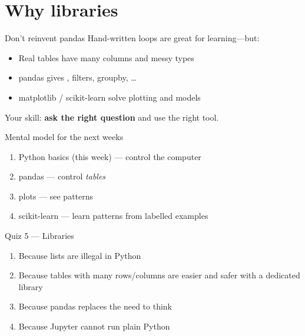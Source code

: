 \documentclass[aspectratio=169,11pt]{beamer}
\begin{document}
    \section{Why libraries}

    \begin{frame}{Don't reinvent pandas}
        Hand-written loops are great for learning---but:
        \begin{itemize}
            \item Real tables have many columns and messy types
            \item pandas gives , filters, groupby, \ldots
            \item matplotlib / scikit-learn solve plotting and models
        \end{itemize}
        \vspace{0.5em}
        Your skill: \textbf{ask the right question} and use the right tool.
    \end{frame}

    \begin{frame}{Mental model for the next weeks}
        \begin{enumerate}
            \item Python basics (this week) --- control the computer
            \item pandas --- control \emph{tables}
            \item plots --- see patterns
            \item scikit-learn --- learn patterns from labelled examples
        \end{enumerate}
    \end{frame}

    \begin{frame}{Quiz 5 --- Libraries}
        \begin{enumerate}
            \item Because lists are illegal in Python
            \item Because tables with many rows/columns are easier and safer with a dedicated library
            \item Because pandas replaces the need to think
            \item Because Jupyter cannot run plain Python
        \end{enumerate}
        \quizpause
    \end{frame}
\end{document}
